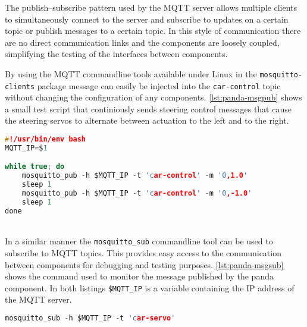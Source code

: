 The publish–subscribe pattern used by the MQTT server allows multiple clients to simultaneously connect to the server and subscribe to updates on a certain topic or publish messages to a certain topic.
In this style of communication there are no direct communication links and the components are loosely coupled, simplifying the testing of the interfaces between components.

By using the MQTT commandline tools available under Linux in the \texttt{mosquitto-clients} package message can easily be injected into the \texttt{car-control} topic without changing the configuration of any components.
\autoref{lst:panda-msgpub} shows a small test script that continiously sends steering control messages that cause the steering servos to alternate between actuation to the left and to the right. \\ %

\begin{minipage}{\linewidth}
\begin{lstlisting}[style=mylistings, language=c, label=lst:panda-msgpub, caption=Injecting steering commands over MQTT]
#!/usr/bin/env bash
MQTT_IP=$1

while true; do
	mosquitto_pub -h $MQTT_IP -t 'car-control' -m '0,1.0'
	sleep 1
	mosquitto_pub -h $MQTT_IP -t 'car-control' -m '0,-1.0'
	sleep 1
done
\end{lstlisting}
\end{minipage} \\

In a similar manner the \texttt{mosquitto\_sub} commandline tool can be used to subscribe to MQTT topics. This provides easy access to the communication between components for debugging and testing purposes.
\autoref{lst:panda-msgsub} shows the command used to monitor the message published by the panda component. In both listings \texttt{\$MQTT\_IP} is a variable containing the IP address of the MQTT server. \\

\begin{minipage}{\linewidth}
\begin{lstlisting}[style=mylistings, language=c, label=lst:panda-msgsub, caption=Subscribing to MQTT topics]
mosquitto_sub -h $MQTT_IP -t 'car-servo'
\end{lstlisting}
\end{minipage} \\
